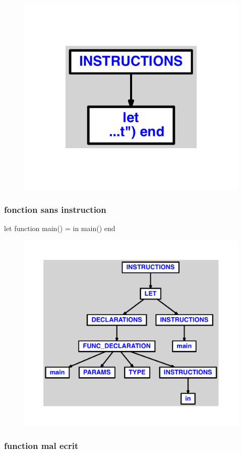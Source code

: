 \documentclass{article}
\begin{document}
\begin{figure}[H]\centering\includegraphics[max width=\textwidth]{ast/ast_215.pdf}\end{figure}\subsubsection{fonction sans instruction}
\begin{verbatimtab}
let
	function main() =
in main() end
\end{verbatimtab}
\begin{figure}[H]\centering\includegraphics[max width=\textwidth]{ast/ast_216.pdf}\end{figure}\subsubsection{function mal ecrit}
\end{document}

